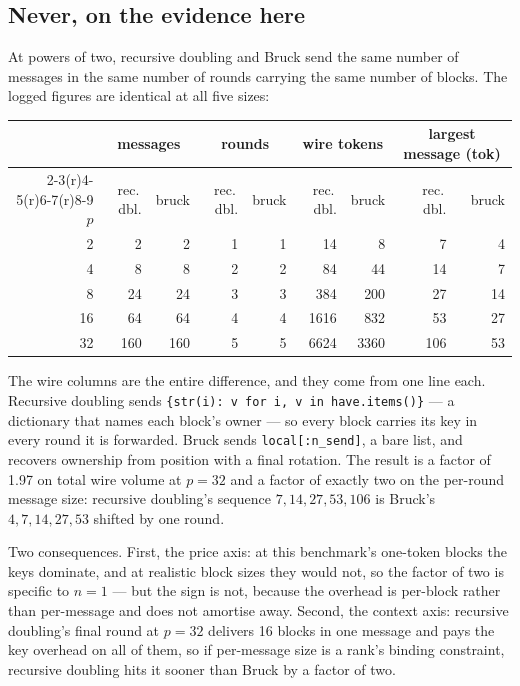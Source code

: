 \documentclass[11pt]{article}
\begin{document}
\subsection{Never, on the evidence here}

At powers of two, recursive doubling and Bruck send the same number of messages in the same number
of rounds carrying the same number of blocks. The logged figures are identical at all five sizes:

\begin{center}\footnotesize
\begin{tabular}{@{}rrrrrrrrr@{}}
\toprule
  & \multicolumn{2}{c}{messages} & \multicolumn{2}{c}{rounds} & \multicolumn{2}{c}{wire tokens} & \multicolumn{2}{c}{largest message (tok)} \\
  \cmidrule(r){2-3}\cmidrule(r){4-5}\cmidrule(r){6-7}\cmidrule(r){8-9}
  $p$ & rec.\,dbl. & bruck & rec.\,dbl. & bruck & rec.\,dbl. & bruck & rec.\,dbl. & bruck \\
\midrule
  2  & 2   & 2   & 1 & 1 & 14   & 8    & 7   & 4  \\
  4  & 8   & 8   & 2 & 2 & 84   & 44   & 14  & 7  \\
  8  & 24  & 24  & 3 & 3 & 384  & 200  & 27  & 14 \\
  16 & 64  & 64  & 4 & 4 & 1616 & 832  & 53  & 27 \\
  32 & 160 & 160 & 5 & 5 & 6624 & 3360 & 106 & 53 \\
\bottomrule
\end{tabular}\normalsize
\end{center}

\noindent
The wire columns are the entire difference, and they come from one line each. Recursive doubling
sends \texttt{\{str(i): v for i, v in have.items()\}} --- a dictionary that names each block's
owner --- so every block carries its key in every round it is forwarded. Bruck sends
\texttt{local[:n\_send]}, a bare list, and recovers ownership from position with a final rotation.
The result is a factor of 1.97 on total wire volume at $p=32$ and a factor of exactly two on the
per-round message size: recursive doubling's sequence $7, 14, 27, 53, 106$ is Bruck's
$4, 7, 14, 27, 53$ shifted by one round.

Two consequences. First, the price axis: at this benchmark's one-token blocks the keys dominate,
and at realistic block sizes they would not, so the factor of two is specific to $n=1$ --- but the
sign is not, because the overhead is per-block rather than per-message and does not amortise away.
Second, the context axis: recursive doubling's final round at $p=32$ delivers 16 blocks in one
message and pays the key overhead on all of them, so if per-message size is a rank's binding
constraint, recursive doubling hits it sooner than Bruck by a factor of two.
\end{document}
